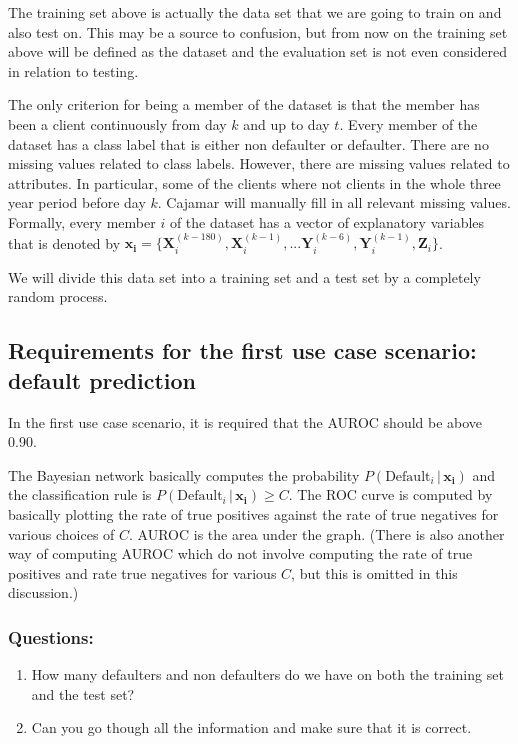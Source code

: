 \documentclass{article}
\theoremstyle{theorem}
\theoremstyle{definition}
\newcommand{\bv}[1]{\bm{#1}}
\newcommand{\X}{\mathbf{X}}
\newcommand{\Y}{\mathbf{Y}}
\newcommand{\Z}{\mathbf{Z}}
\begin{document}
The training set above is actually the data set that we are going to train on and also test on. This may be a source to confusion, but from now on the training set above will be defined as the dataset and the evaluation set is not even considered in relation to testing. 

The only criterion for being a member of the dataset is that the member has been a client continuously from day $k$ and up to day $t$.  Every member of the dataset has a class label that is either non defaulter or defaulter.  There are no missing values related to class labels.  However, there are missing values related to attributes.  In particular, some of the clients where not clients in the whole three year period before day $k$.  Cajamar will manually fill in all relevant missing values.  Formally, every member $i$ of the dataset has a vector of explanatory variables that is denoted by $\bv{x_i} =\{ \X_i^{(k-180)},  \X_i^{(k-1)}, ...\Y_i^{(k-6)}, \Y_i^{(k-1)},\Z_i\}$.  

We will divide this data set into a training set and a test set by a completely random process.

\subsection{Requirements for the first use case scenario: default prediction}

In the first use case scenario, it is required that the AUROC should be above 0.90.
 
The Bayesian network basically computes the probability $P(\mbox{Default}_i \,|\, \bv{x_i})$ and the classification rule is
$P(\mbox{Default}_i \,|\, \bv{x_i}) \geq C$.  The ROC curve is computed by basically plotting the rate of true positives against the rate of true negatives for various choices of $C$.  AUROC is the area under the graph.  (There is also another way of computing AUROC which do not involve computing the rate of true positives and rate true negatives for various $C$, but this is omitted in this discussion.)

\subsubsection*{Questions: }
\begin{enumerate}
\item How many defaulters and non defaulters do we have on both the training set and the test set?
\item Can you go though all the information and make sure that it is correct.
\end{enumerate}
\end{document}
